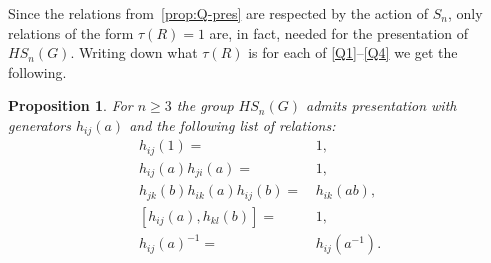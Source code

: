 \documentclass[oneside, 12pt]{amsart}
\theoremstyle{plain}
\numberwithin{equation}{section}
\numberwithin{lemma}{section}
\newtheorem{prop}[lemma]{Proposition}
\theoremstyle{remark}
\theoremstyle{definition}
\begin{document}
Since the relations from~\cref{prop:Q-pres} are respected by the action of $S_n$,
 only relations of the form $\tau(R)=1$ are, in fact, needed for the presentation of $HS_n(G)$.
Writing down what $\tau(R)$ is for each of \eqref{Q1}--\eqref{Q4} we get the following.
 
\begin{prop} \label{prop:HSpres} For $n\geq 3$ the group $HS_n(G)$ admits presentation with generators $h_{ij}(a)$ and the following list of relations:
\begin{align}
h_{ij}(1)                     = &\, 1,              \tag{HS0} \label{H0} \\
h_{ij}(a) h_{ji}(a)           = &\, 1,              \tag{HS1} \label{H1} \\
h_{jk}(b) h_{ik}(a) h_{ij}(b) = &\, h_{ik}(ab),     \tag{HS2} \label{H2} \\
[h_{ij}(a), h_{kl}(b)]        = &\, 1,              \tag{HS3} \label{H3} \\
h_{ij}(a)^{-1}                = &\, h_{ij}(a^{-1}). \tag{HS4} \label{H4}
\end{align}
\end{prop}
\end{document}
